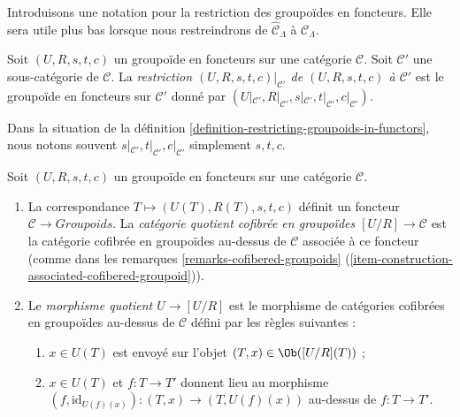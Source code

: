 \noindent
Introduisons une notation pour la restriction des groupoïdes en foncteurs. Elle
sera utile plus bas lorsque nous restreindrons de $\widehat{\mathcal
C}_\Lambda$ à $\mathcal{C}_\Lambda$.

\begin{definition}
\label{definition-restricting-groupoids-in-functors}
Soit $(U, R, s, t, c)$ un groupoïde en foncteurs sur une catégorie
$\mathcal{C}$. Soit $\mathcal{C}'$ une sous-catégorie de $\mathcal{C}$. La
{\it restriction $(U, R, s, t, c)|_{\mathcal{C}'}$ de $(U, R, s, t, c)$ à
$\mathcal{C}'$} est le groupoïde en foncteurs sur $\mathcal{C}'$ donné par
$(U|_{\mathcal{C}'}, R|_{\mathcal
C'}, s|_{\mathcal{C}'}, t|_{\mathcal{C}'}, c|_{\mathcal{C}'})$.
\end{definition}

\begin{remark}
\label{remark-notation-restriction}
Dans la situation de la définition
\ref{definition-restricting-groupoids-in-functors}, nous notons souvent
$s|_{\mathcal{C}'}, t|_{\mathcal{C}'}, c|_{\mathcal{C}'}$ simplement $s, t, c$.
\end{remark}

\begin{definition}
\label{definition-quotient}
Soit $(U, R, s, t, c)$ un groupoïde en foncteurs sur une catégorie
$\mathcal{C}$.
\begin{enumerate}
\item La correspondance $T \mapsto  (U(T), R(T), s, t, c)$ définit un foncteur
$\mathcal{C} \to \textit{Groupoids}$. La {\it catégorie quotient cofibrée en
groupoïdes $[U/R] \to \mathcal{C}$} est la catégorie cofibrée en groupoïdes
au-dessus de $\mathcal{C}$ associée à ce foncteur (comme dans les remarques
\ref{remarks-cofibered-groupoids}
(\ref{item-construction-associated-cofibered-groupoid})).
\item Le {\it morphisme quotient $U \to [U/R]$} est le morphisme de catégories
cofibrées en groupoïdes au-dessus de $\mathcal{C}$ défini par les règles
suivantes :
\begin{enumerate}
\item $x \in U(T)$ est envoyé sur l'objet $(T, x) \in \Ob([U/R](T))$ ;
\item $x \in U(T)$ et $f : T \to T'$ donnent lieu au morphisme
$(f, \text{id}_{U(f)(x)}): (T, x) \to (T, U(f)(x))$ au-dessus de
$f : T \to T'$.
\end{enumerate}
\end{enumerate}
\end{definition}






